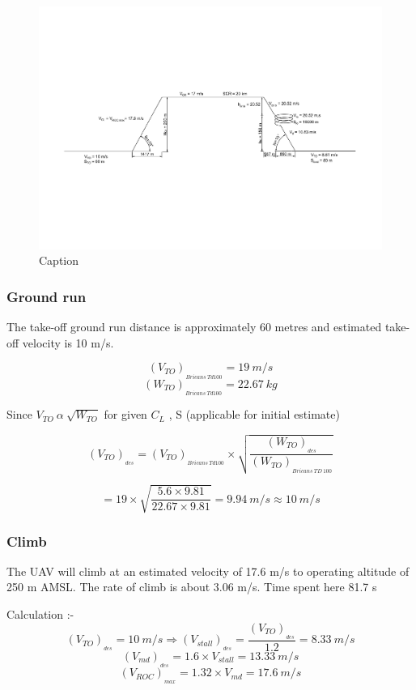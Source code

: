 \documentclass[12 pt]{article}
\begin{document}
\begin{figure}[h]
    \centering
    \includegraphics[width = \linewidth]{Drawing1-Model_final.pdf}
    \caption{Caption}
    \label{fig:enter-label}
\end{figure}


\subsubsection{Ground run}
The take-off ground run distance is approximately 60 metres and estimated take-off velocity is 10 m/s. \cite{EgglestonUnknownTitle2015}

$$ (V_{TO})_{_{Bricans \: Td100}} = 19 \: m/s$$
$$ (W_{TO})_{_{Bricans \: Td100}} = 22.67 \: kg$$

Since $ V_{TO} \: \alpha \: \sqrt{W_{TO}} $ for given $C_L$ , S (applicable for initial estimate)

$$ (V_{TO})_{_{des}} = (V_{TO})_{_{Bricans \: Td100}} \times \sqrt{\frac{(W_{TO})_{_{des}}}{(W_{TO})_{_{Bricans \: TD \: 100}}}} $$

$$ = 19 \times \sqrt{\frac{5.6 \times 9.81}{22.67 \times 9.81}} = 9.94 \: m/s \approx 10 \: m/s $$

\subsubsection{Climb \cite{1000_questions} }
The UAV will climb at an estimated velocity of 17.6 m/s to operating altitude of 250 m AMSL. The rate of climb is about 3.06 m/s. Time spent here 81.7 s

Calculation :- 
$$ (V_{TO})_{_{des}} = 10 \: m/s \Rightarrow (V_{stall})_{_{des}} = \frac{(V_{TO})_{_{des}}}{1.2} = 8.33 \: m/s $$
$$ (V_{md})_{_{des}} = 1.6 \times V_{stall} = 13.33 \: m/s $$
$$ (V_{ROC})_{_{max}} = 1.32 \times V_{md} = 17.6 \: m/s $$
\end{document}
